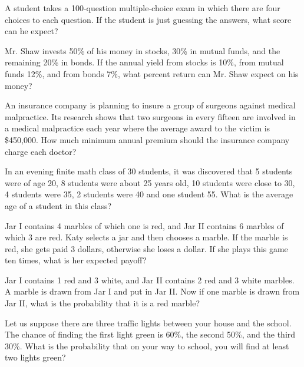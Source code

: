 \begin{puzzle}
    A student takes a 100-question multiple-choice exam in which there are four choices to each question. If the student is just guessing the answers, what score can he expect?
\end{puzzle}

\begin{puzzle}
    Mr. Shaw invests 50\% of his money in stocks, 30\% in mutual funds, and the remaining 20\% in bonds. If the annual yield from stocks is 10\%, from mutual funds 12\%, and from bonds 7\%, what percent return can Mr. Shaw expect on his money?
\end{puzzle}

\begin{puzzle}
    An insurance company is planning to insure a group of surgeons against medical malpractice. Its research shows that two surgeons in every fifteen are involved in a medical malpractice each year where the average award to the victim is \$450,000. How much minimum annual premium should the insurance company charge each doctor?
\end{puzzle}

\begin{puzzle}
    In an evening finite math class of 30 students, it was discovered that 5 students were of age 20, 8 students were about 25 years old, 10 students were close to 30, 4 students were 35, 2 students were 40 and one student 55. What is the average age of a student in this class?
\end{puzzle}

\begin{puzzle}
    Jar I contains 4 marbles of which one is red, and Jar II contains 6 marbles of which 3 are red. Katy selects a jar and then chooses a marble. If the marble is red, she gets paid 3 dollars, otherwise she loses a dollar. If she plays this game ten times, what is her expected payoff?
\end{puzzle}

\begin{puzzle}
    Jar I contains 1 red and 3 white, and Jar II contains 2 red and 3 white marbles. A marble is drawn from Jar I and put in Jar II. Now if one marble is drawn from Jar II, what is the probability that it is a red marble?
\end{puzzle}

\begin{puzzle}
    Let us suppose there are three traffic lights between your house and the school. The chance of finding the first light green is 60\%, the second 50\%, and the third 30\%. What is the probability that on your way to school, you will find at least two lights green?
\end{puzzle}


